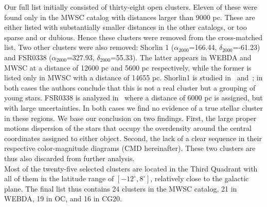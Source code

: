 \documentclass{aa}
\begin{document}
 Our full list initially consisted of thirty-eight open clusters. Eleven of
 these were found only in the MWSC catalog with distances larger than 9000 pc.
 These are either listed with substantially smaller distances in the other
 catalogs, or too sparse and or dubious. Hence these clusters were removed from
 the cross-matched list.
 Two other clusters were also removed: Shorlin 1 ($\alpha_{2000}$=166.44,
 $\delta_{2000}$=-61.23) and FSR0338
 ($\alpha_{2000}$=327.93, $\delta_{2000}$=55.33). The latter appears in WEBDA and
 MWSC at a distance of 12600 pc and 5600 pc respectively, while the former is
 listed only in MWSC with a distance of 14655 pc. Shorlin1 is studied
 in~\cite{Carraro_2009} and~\cite{Turner_2012}; in both cases the authors
 conclude that this is not a real cluster but a grouping of young stars.
 FSR0338 is analyzed in~\cite{Froebrich_2010} where a distance of 6000 pc is
 assigned, but with large uncertainties.
 In both cases we find no evidence of a true stellar cluster in these regions.
 We base our conclusion on two findings. First, the large proper motions
 dispersion of the stars that occupy the overdensity around the central
 coordinates assigned to either object. Second, the lack of a clear sequence in
 their respective color-magnitude diagrams (CMD hereinafter). These two clusters
 are thus also discarded from further analysis.\\

 Most of the twenty-five selected clusters are located in the Third Quadrant
 with all of them in the latitude range of $\left[-12^{\circ}, 8^{\circ}\right]$,
 relatively close to the galactic plane. The final list thus contains 24
 clusters in the MWSC catalog, 21 in WEBDA, 19 in OC, and 16 in CG20.
\end{document}
